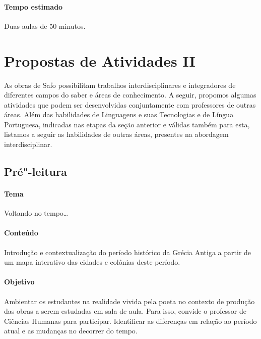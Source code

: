 \documentclass[12pt]{extarticle}
\begin{document}



\paragraph{Tempo estimado} Duas aulas de 50 minutos.

\section{Propostas de Atividades II}

As obras de Safo possibilitam trabalhos interdisciplinares e
integradores de diferentes campos do saber e áreas de conhecimento. A
seguir, propomos algumas atividades que podem ser desenvolvidas
conjuntamente com professores de outras áreas. Além das habilidades de
Linguagens e suas Tecnologias e de Língua Portuguesa, indicadas nas
etapas da seção anterior e válidas também para esta, listamos a seguir
as habilidades de outras áreas, presentes na abordagem interdisciplinar.

\subsection{Pré"-leitura}

\paragraph{Tema} Voltando no tempo{}\dots{}

\paragraph{Conteúdo} Introdução e contextualização do período histórico
da Grécia Antiga a partir de um mapa interativo das cidades e colônias 
deste período.

\paragraph{Objetivo} Ambientar os estudantes na realidade vivida pela
poeta no contexto de produção das obras a serem estudadas em sala de aula. 
Para isso, convide o professor de Ciências Humanas para participar.
Identificar as diferenças em relação ao período atual e as mudanças no decorrer
do tempo.
\end{document}

